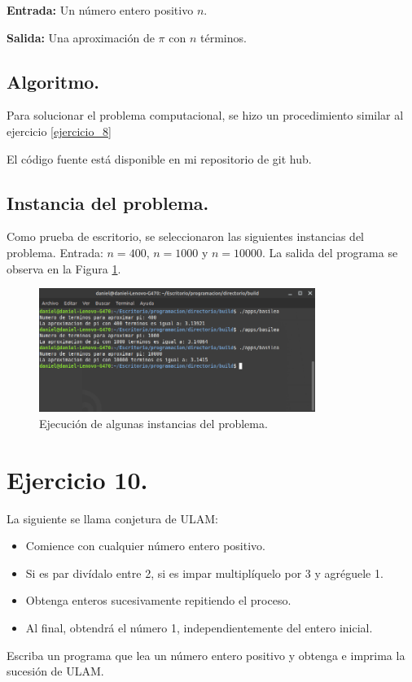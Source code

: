 \documentclass[12pt,letterpaper]{article}
\begin{document}
\textbf{Entrada:} Un n\'umero entero positivo $n$.

\textbf{Salida:} Una aproximaci\'on de $\pi$ con $n$ t\'erminos.

\subsection{Algoritmo.}

Para solucionar el problema computacional, se hizo un procedimiento similar al ejercicio \ref{ejercicio_8}


El código fuente está disponible en mi repositorio de git hub. \cite{url:basilea}

\subsection{Instancia del problema.}
Como prueba de escritorio, se seleccionaron las siguientes instancias del problema. Entrada: $n=400$, $n=1000$ y $n=10000$. La salida del programa se observa en la Figura \ref{fig:basilea}.
\begin{figure}[ht!]
  \centering
  \includegraphics[width=0.8\textwidth]{figures/basilea}
  \caption{Ejecución de algunas instancias del problema.}
  \label{fig:basilea}
\end{figure}


\section{Ejercicio 10.}

La siguiente se llama conjetura de ULAM:
\begin{itemize}
	\item Comience con cualquier n\'umero entero positivo. 
	\item Si es par div\'idalo entre 2, si es impar multipl\'iquelo por 3 y agr\'eguele 1.
	\item Obtenga enteros sucesivamente repitiendo el proceso.
	\item Al final, obtendr\'a el n\'umero 1, independientemente del entero inicial.
\end{itemize}
Escriba un programa que lea un n\'umero entero positivo y obtenga e imprima la sucesi\'on de ULAM.
\end{document}
